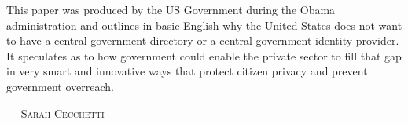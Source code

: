 This paper was produced by the US Government during the Obama administration and outlines in basic English why the United States does not want to have a central government directory or a central government identity provider. It speculates as to how government could enable the private sector to fill that gap in very smart and innovative ways that protect citizen privacy and prevent government overreach. 
\setlength{\parindent}{0cm}\par\textsc{ --- Sarah Cecchetti }\par\vspace{12pt}\setlength{\parindent}{15pt}

